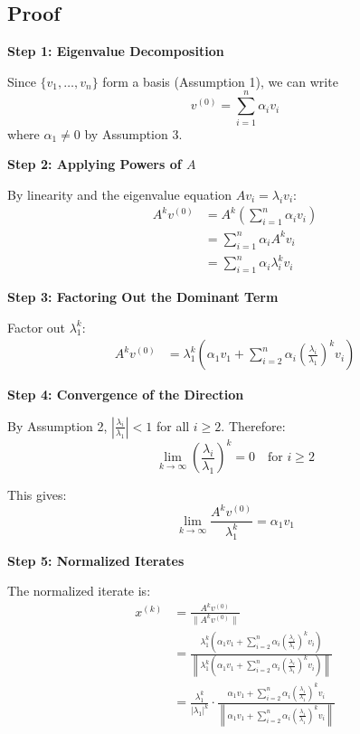 \documentclass[12pt]{article}
\begin{document}
\subsection*{Proof}

\textbf{Step 1: Eigenvalue Decomposition}

Since $\{v_1, \ldots, v_n\}$ form a basis (Assumption 1), we can write
\begin{equation}
v^{(0)} = \sum_{i=1}^{n} \alpha_i v_i
\end{equation}
where $\alpha_1 \neq 0$ by Assumption 3.

\textbf{Step 2: Applying Powers of $A$}

By linearity and the eigenvalue equation $Av_i = \lambda_i v_i$:
\begin{align}
A^k v^{(0)} &= A^k \left(\sum_{i=1}^{n} \alpha_i v_i\right) \\
&= \sum_{i=1}^{n} \alpha_i A^k v_i \\
&= \sum_{i=1}^{n} \alpha_i \lambda_i^k v_i
\end{align}

\textbf{Step 3: Factoring Out the Dominant Term}

Factor out $\lambda_1^k$:
\begin{align}
A^k v^{(0)} &= \lambda_1^k \left(\alpha_1 v_1 + \sum_{i=2}^{n} \alpha_i \left(\frac{\lambda_i}{\lambda_1}\right)^k v_i\right)
\end{align}

\textbf{Step 4: Convergence of the Direction}

By Assumption 2, $\left|\frac{\lambda_i}{\lambda_1}\right| < 1$ for all $i \geq 2$. Therefore:
\begin{equation}
\lim_{k \to \infty} \left(\frac{\lambda_i}{\lambda_1}\right)^k = 0 \quad \text{for } i \geq 2
\end{equation}

This gives:
\begin{equation}
\lim_{k \to \infty} \frac{A^k v^{(0)}}{\lambda_1^k} = \alpha_1 v_1
\end{equation}

\textbf{Step 5: Normalized Iterates}

The normalized iterate is:
\begin{align}
x^{(k)} &= \frac{A^k v^{(0)}}{\|A^k v^{(0)}\|} \\
&= \frac{\lambda_1^k \left(\alpha_1 v_1 + \sum_{i=2}^{n} \alpha_i \left(\frac{\lambda_i}{\lambda_1}\right)^k v_i\right)}{\left\|\lambda_1^k \left(\alpha_1 v_1 + \sum_{i=2}^{n} \alpha_i \left(\frac{\lambda_i}{\lambda_1}\right)^k v_i\right)\right\|} \\
&= \frac{\lambda_1^k}{|\lambda_1|^k} \cdot \frac{\alpha_1 v_1 + \sum_{i=2}^{n} \alpha_i \left(\frac{\lambda_i}{\lambda_1}\right)^k v_i}{\left\|\alpha_1 v_1 + \sum_{i=2}^{n} \alpha_i \left(\frac{\lambda_i}{\lambda_1}\right)^k v_i\right\|}
\end{align}
\end{document}
